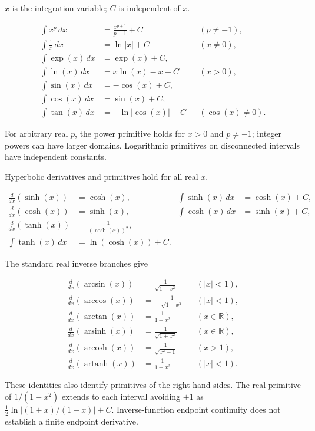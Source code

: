 \documentclass[11pt,oneside,openany]{book}
\begin{document}
\begin{minipage}[t]{0.485\textwidth}\vspace{0pt}

\(x\) is the integration variable; \(C\) is independent of \(x\).

\[
\begin{aligned}
\int x^p\,dx&=\frac{x^{p+1}}{p+1}+C&& (p\ne-1),\\
\int\frac{1}{x}\,dx&=\ln|x|+C&&(x\ne0),\\
\int\exp(x)\,dx&=\exp(x)+C,\\
\int\ln(x)\,dx&=x\ln(x)-x+C&&(x>0),\\
\int\sin(x)\,dx&=-\cos(x)+C,\\
\int\cos(x)\,dx&=\sin(x)+C,\\
\int\tan(x)\,dx&=-\ln|\cos(x)|+C&&(\cos(x)\ne0).
\end{aligned}
\]

For arbitrary real \(p\), the power primitive holds for \(x>0\) and \(p\ne-1\);
integer powers can have larger domains. Logarithmic primitives on disconnected
intervals have independent constants.


Hyperbolic derivatives and primitives hold for all real \(x\).

\[
\begin{aligned}
\frac{d}{dx}(\sinh(x))&=\cosh(x),&\int\sinh(x)\,dx&=\cosh(x)+C,\\
\frac{d}{dx}(\cosh(x))&=\sinh(x),&\int\cosh(x)\,dx&=\sinh(x)+C,\\
\frac{d}{dx}(\tanh(x))&=\frac{1}{(\cosh(x))^2},\\
\int\tanh(x)\,dx&=\ln(\cosh(x))+C.
\end{aligned}
\]

The standard real inverse branches give

\[
\begin{aligned}
\frac{d}{dx}(\arcsin(x))&=\frac{1}{\sqrt{1-x^2}}&&(|x|<1),\\
\frac{d}{dx}(\arccos(x))&=-\frac{1}{\sqrt{1-x^2}}&&(|x|<1),\\
\frac{d}{dx}(\arctan(x))&=\frac{1}{1+x^2}&&(x\in\mathbb R),\\
\frac{d}{dx}(\operatorname{arsinh}(x))&=\frac{1}{\sqrt{1+x^2}}&&(x\in\mathbb R),\\
\frac{d}{dx}(\operatorname{arcosh}(x))&=\frac{1}{\sqrt{x^2-1}}&&(x>1),\\
\frac{d}{dx}(\operatorname{artanh}(x))&=\frac{1}{1-x^2}&&(|x|<1).
\end{aligned}
\]

These identities also identify primitives of the right-hand sides. The real
primitive of \(1/(1-x^2)\) extends to each interval avoiding \(\pm1\) as
\(\tfrac12\ln|(1+x)/(1-x)|+C\). Inverse-function endpoint continuity does not
establish a finite endpoint derivative.
\end{minipage}
\end{document}

